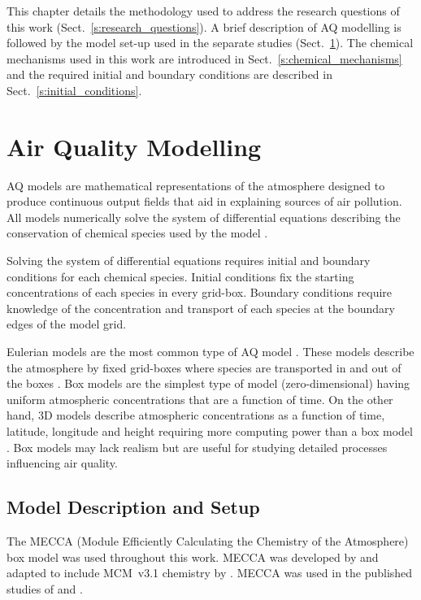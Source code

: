 \vspace{-4mm}
This chapter details the methodology used to address the research questions of this work (Sect.~\ref{s:research_questions}).
A brief description of AQ modelling is followed by the model set-up used in the separate studies (Sect.~\ref{s:modelling}). 
The chemical mechanisms used in this work are introduced in Sect.~\ref{s:chemical_mechanisms} and the required initial and boundary conditions are described in Sect.~\ref{s:initial_conditions}.

\vspace{-3mm}
\section{Air Quality Modelling} \label{s:modelling}
\vspace{-3mm}
AQ models are mathematical representations of the atmosphere designed to produce continuous output fields that aid in explaining sources of air pollution.
All models numerically solve the system of differential equations describing the conservation of chemical species used by the model \citep{Russell:2000}.

Solving the system of differential equations requires initial and boundary conditions for each chemical species.
Initial conditions fix the starting concentrations of each species in every grid-box.
Boundary conditions require knowledge of the concentration and transport of each species at the boundary edges of the model grid.

Eulerian models are the most common type of AQ model \citep{Russell:2000}.
These models describe the atmosphere by fixed grid-boxes where species are transported in and out of the boxes \citep{Seinfeld:2006}. 
Box models are the simplest type of model (zero-dimensional) having uniform atmospheric concentrations that are a function of time.
On the other hand, 3D models describe atmospheric concentrations as a function of time, latitude, longitude and height requiring more computing power than a box model \citep{Seinfeld:2006}.
Box models may lack realism but are useful for studying detailed processes influencing air quality.

\subsection{Model Description and Setup} \label{ss:model_setup}
The MECCA (Module Efficiently Calculating the Chemistry of the Atmosphere) box model was used throughout this work.
MECCA was developed by \citet{Sander:2005} and adapted to include MCM~v3.1 chemistry by \citet{Butler:2011}.
MECCA was used in the published studies of \citet{Kubistin:2010} and \citet{Lourens:2016}.

